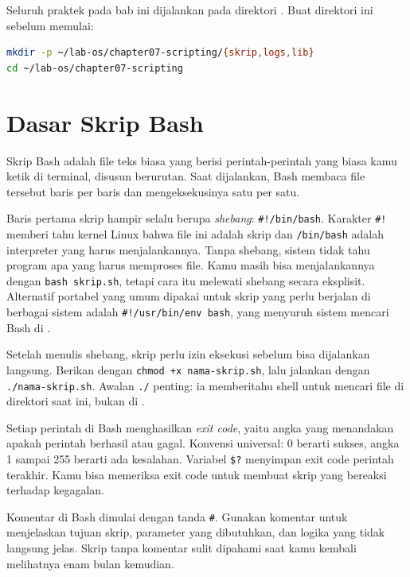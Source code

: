 \begin{notebox}
Seluruh praktek pada bab ini dijalankan pada direktori
.
Buat direktori ini sebelum memulai:
\begin{lstlisting}[language=bash]
mkdir -p ~/lab-os/chapter07-scripting/{skrip,logs,lib}
cd ~/lab-os/chapter07-scripting
\end{lstlisting}
\end{notebox}

\section{Dasar Skrip Bash}
\label{sec:dasar-skrip-bash}

Skrip Bash adalah file teks biasa yang berisi perintah-perintah yang
biasa kamu ketik di terminal, disusun berurutan. Saat dijalankan, Bash
membaca file tersebut baris per baris dan mengeksekusinya satu per satu.

Baris pertama skrip hampir selalu berupa \textit{shebang}: \texttt{\#!/bin/bash}.
Karakter \texttt{\#!} memberi tahu kernel Linux bahwa file ini adalah
skrip dan \texttt{/bin/bash} adalah interpreter yang harus menjalankannya.
Tanpa shebang, sistem tidak tahu program apa yang harus memproses file.
Kamu masih bisa menjalankannya dengan \texttt{bash skrip.sh}, tetapi cara
itu melewati shebang secara eksplisit. Alternatif portabel yang umum
dipakai untuk skrip yang perlu berjalan di berbagai sistem adalah
\texttt{\#!/usr/bin/env bash}, yang menyuruh sistem mencari Bash di
.

Setelah menulis shebang, skrip perlu izin eksekusi sebelum bisa
dijalankan langsung. Berikan dengan \texttt{chmod +x nama-skrip.sh},
lalu jalankan dengan \texttt{./nama-skrip.sh}. Awalan \texttt{./} penting:
ia memberitahu shell untuk mencari file di direktori saat ini, bukan di
.

Setiap perintah di Bash menghasilkan \textit{exit code}, yaitu angka yang
menandakan apakah perintah berhasil atau gagal. Konvensi universal: 0
berarti sukses, angka 1 sampai 255 berarti ada kesalahan. Variabel
\texttt{\$?} menyimpan exit code perintah terakhir. Kamu bisa memeriksa
exit code untuk membuat skrip yang bereaksi terhadap kegagalan.

Komentar di Bash dimulai dengan tanda \texttt{\#}. Gunakan komentar untuk
menjelaskan tujuan skrip, parameter yang dibutuhkan, dan logika yang tidak
langsung jelas. Skrip tanpa komentar sulit dipahami saat kamu kembali
melihatnya enam bulan kemudian.

